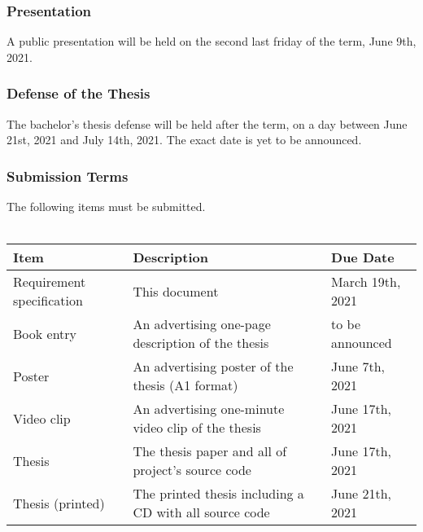 \subsubsection{Presentation}
A public presentation will be held on the second last friday of the term, June 9th, 2021.

\subsubsection{Defense of the Thesis}
The bachelor's thesis defense will be held after the term, on a day between June 21st, 2021 and July 14th, 2021. The exact date is yet to be announced. 

\subsubsection{Submission Terms}
The following items must be submitted.
\\\\
\noindent
\begin{tabular}{|l|l|l|}
    \hline
    \textbf{Item}               & \textbf{Description}                                      & \textbf{Due Date}     \\ \hline
    Requirement specification   & This document                                             & March 19th, 2021      \\ \hline
    Book entry                  & An advertising one-page description of the thesis         & to be announced       \\ \hline
    Poster                      & An advertising poster of the thesis (A1 format)           & June 7th, 2021        \\ \hline
    Video clip                  & An advertising one-minute video clip of the thesis        & June 17th, 2021       \\ \hline
    Thesis                      & The thesis paper and all of project's source code         & June 17th, 2021       \\ \hline
    Thesis (printed)            & The printed thesis including a CD with all source code    & June 21th, 2021       \\ \hline
\end{tabular}
\newline
\noindent
